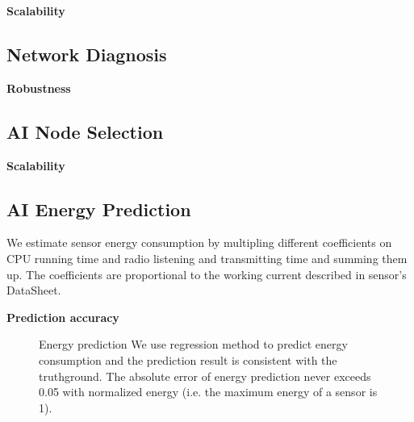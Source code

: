 \textbf{Scalability}

\subsection{Network Diagnosis}
\textbf{Robustness}

\subsection{AI Node Selection}
\textbf{Scalability}

\subsection{AI Energy Prediction}

We estimate sensor energy consumption by multipling different coefficients on
CPU running time and radio listening and transmitting time and summing them up.
The coefficients are proportional to the working current described in sensor's
DataSheet.

\textbf{Prediction accuracy}

\begin{figure}[htbp]
	\centering
	\hspace{0.3cm}
	\vspace{-0.1in}
	\caption{Energy prediction
		\textnormal{
			We use regression method to predict energy consumption and the
			prediction result is consistent with the truthground.  The absolute
			error of energy prediction never exceeds 0.05 with normalized energy
			(i.e. the maximum energy of a sensor is 1).
		}
	}
	\label{fig:energy_pred}
\end{figure}

